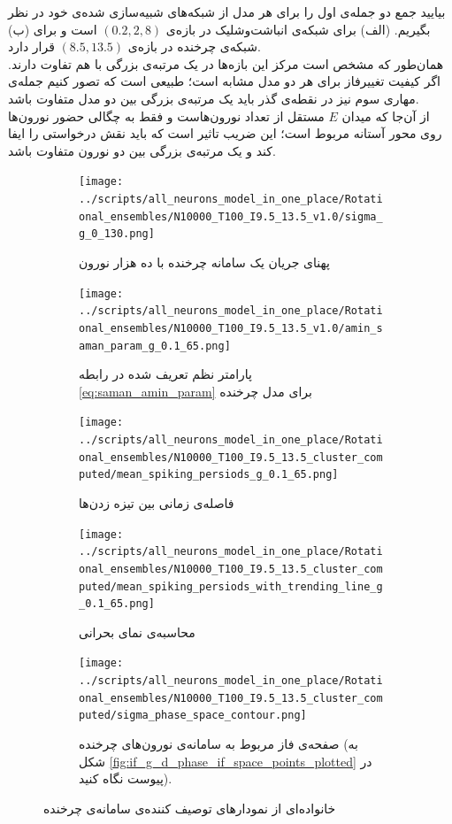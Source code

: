 بیایید جمع دو جمله‌ی اول را برای هر مدل از شبکه‌های شبیه‌سازی شده‌ی خود در نظر بگیریم. (الف) برای شبکه‌ی انباشت‌وشلیک در بازه‌ی 
$(0.2, 2,8)$
است و برای (ب) شبکه‌ی چرخنده در بازه‌ی
$(8.5, 13.5)$
قرار دارد.\\
 همان‌طور که مشخص است مرکز این بازه‌ها در یک مرتبه‌ی بزرگی با هم تفاوت دارند. اگر کیفیت تغییرفاز برای هر دو مدل مشابه است؛ طبیعی است که تصور کنیم جمله‌ی مهاری سوم نیز در نقطه‌ی گذر باید  یک مرتبه‌ی بزرگی بین دو مدل متفاوت باشد.\\
 از آن‌جا که میدان
 $E$
 مستقل از تعداد نورون‌هاست و فقط به چگالی حضور نورون‌ها روی محور آستانه مربوط است؛ این ضریب تاثیر است که باید نقش درخواستی را ایفا کند و یک مرتبه‌ی بزرگی بین دو نورون متفاوت باشد.
\begin{figure}
	\begin{subfigure}[b]{0.5\textwidth}
	\centering
	\texttt{[image: ../scripts/all\_neurons\_model\_in\_one\_place/Rotational\_ensembles/N10000\_T100\_I9.5\_13.5\_v1.0/sigma\_g\_0\_130.png]}
	\caption{پهنای جریان یک سامانه چرخنده با ده هزار نورون}
	\label{fig:sigma_rotational}
	\end{subfigure}
	\hfill
	\begin{subfigure}[b]{0.5\textwidth}
		\centering
		\texttt{[image: ../scripts/all\_neurons\_model\_in\_one\_place/Rotational\_ensembles/N10000\_T100\_I9.5\_13.5\_v1.0/amin\_saman\_param\_g\_0.1\_65.png]}
		\caption{پارامتر نظم تعریف شده در رابطه \ref{eq:saman_amin_param} برای مدل چرخنده }
		\label{fig:amin_saman_rotational}
	\end{subfigure}
	\hfil
	\begin{subfigure}[b]{0.5\textwidth}
		\centering
		\texttt{[image: ../scripts/all\_neurons\_model\_in\_one\_place/Rotational\_ensembles/N10000\_T100\_I9.5\_13.5\_cluster\_computed/mean\_spiking\_persiods\_g\_0.1\_65.png]}
		\caption{فاصله‌ی زمانی بین تیزه زدن‌ها}
		\label{fig:interspikes_rotational}
	\end{subfigure}
	\hfill
	\begin{subfigure}[b]{0.5\textwidth}
		\centering
		\texttt{[image: ../scripts/all\_neurons\_model\_in\_one\_place/Rotational\_ensembles/N10000\_T100\_I9.5\_13.5\_cluster\_computed/mean\_spiking\_persiods\_with\_trending\_line\_g\_0.1\_65.png]}
		\caption{محاسبه‌ی نمای بحرانی}
		\label{fig:interspikes_rotational_trending_line}
	\end{subfigure}
	\hfill
	\begin{subfigure}[b]{0.5\textwidth}
		\centering
		\texttt{[image: ../scripts/all\_neurons\_model\_in\_one\_place/Rotational\_ensembles/N10000\_T100\_I9.5\_13.5\_cluster\_computed/sigma\_phase\_space\_contour.png]}
		\caption{صفحه‌ی فاز مربوط به سامانه‌ی نورون‌های چرخنده (به شکل \ref{fig:if_g_d_phase_if_space_points_plotted}
			در پیوست نگاه کنید).
		}
		\label{fig:rot_g_d_phase_space}
	\end{subfigure}
	\caption{خانواده‌ای از نمودارهای توصیف کننده‌ی سامانه‌ی چرخنده}
\end{figure}




